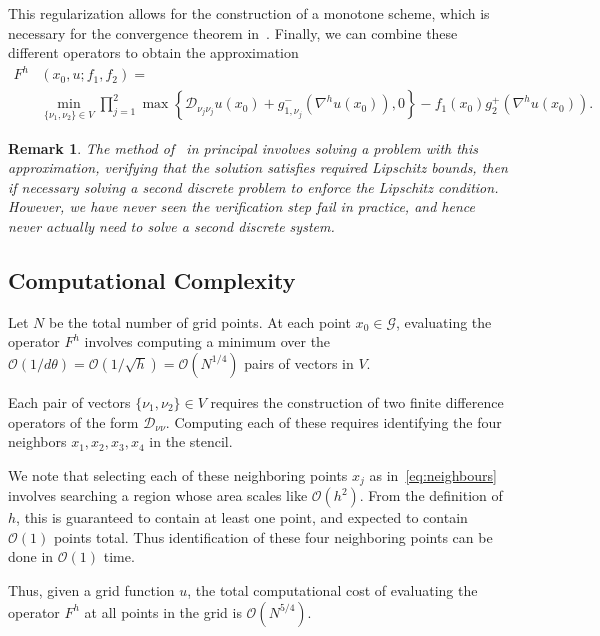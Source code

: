 \documentclass{amsart}
\newcommand{\bq}{\begin{equation}}
\newcommand{\eq}{\end{equation}}
\newcommand{\G}{\mathcal{G}}
\newcommand{\bO}{\mathcal{O}}
\newcommand{\Dt}{\mathcal{D}}
\theoremstyle{lemma}
\newtheorem{remark}[theorem]{Remark}
\theoremstyle{remark}
\begin{document}
This regularization allows for the construction of a monotone scheme, which is necessary for the convergence theorem in~\cite{HT_OTonSphere}. Finally, we can combine these different operators to obtain the approximation
\bq\label{eq:approx}
\begin{split}
F^h&(x_0,u;f_1,f_2) = \\ &\min\limits_{\{\nu_1,\nu_2\}\in V} \prod\limits_{j=1}^2 \max\left\{\Dt_{\nu_j\nu_j}u(x_0) + g^-_{1,\nu_j}(\nabla^h u(x_0)), 0\right\} - f_1(x_0)g_2^+\left(\nabla^h u(x_0)\right).
\end{split}
\eq



\begin{remark}
The method of~\cite{HT_OTonSphere2} in principal involves solving a problem with this approximation, verifying that the solution satisfies required Lipschitz bounds, then if necessary solving a second discrete problem to enforce the Lipschitz condition.  However, we have never seen the verification step fail in practice, and hence never actually need to solve a second discrete system. 
\end{remark}

\subsection{Computational Complexity}
Let $N$ be the total number of grid points.  
At each point $x_0\in\G$, evaluating the operator $F^h$ involves computing a minimum over the $\bO\left(1/d\theta\right) = \bO\left(1/\sqrt{h}\right)=\bO\left(N^{1/4}\right)$ pairs of vectors in $V$.

Each pair of vectors $\{\nu_1,\nu_2\}\in V$ requires the construction of two finite difference operators of the form $\Dt_{\nu\nu}$.  Computing each of these requires identifying the four neighbors $x_1, x_2, x_3, x_4$ in the stencil.

We note that selecting each of these neighboring points $x_j$ as in~\eqref{eq:neighbours} involves searching a region whose area scales like $\bO(h^2)$.  From the definition of $h$, this is guaranteed to contain at least one point, and expected to contain $\bO(1)$ points total. Thus identification of these four neighboring points can be done in $\bO(1)$ time.

Thus, given a grid function $u$, the total computational cost of evaluating the operator $F^h$ at all points in the grid is $\bO\left(N^{5/4}\right)$.
\end{document}
